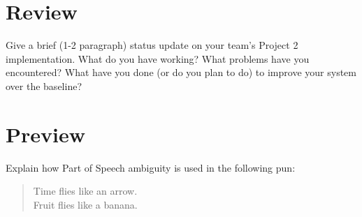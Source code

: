 \documentclass[11pt,letterpaper,boxed]{hmcpset}
\begin{document}
\section*{Review} 
 
\begin{problem}
Give a brief (1-2 paragraph) status update on your team's Project 2 implementation. What do you have working? What problems have you encountered? What have you done (or do you plan to do) to improve your system over the baseline?
\end{problem}
\begin{solution}
\vspace{15cm}
\end{solution}

\pagebreak

\section*{Preview} 
\begin{problem}
Explain how Part of Speech ambiguity is used in the following pun:

\begin{quote}
Time flies like an arrow. \\
Fruit flies like a banana.
\end{quote}
\end{problem}

\begin{solution}
\vspace{10cm}
\end{solution}
\end{document}
